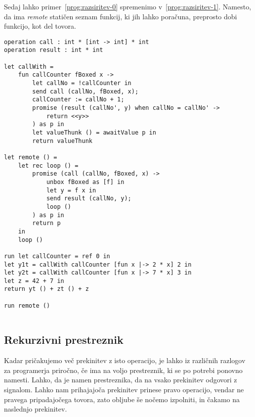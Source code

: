 Sedaj lahko primer~\ref{prog:razsiritev-0} spremenimo v~\ref{prog:razsiritev-1}. Namesto, da ima \emph{remote} statičen seznam funkcij, ki jih lahko poračuna, preprosto dobi funkcijo, kot del tovora.  

\begin{lstlisting}[caption={Računanje zahtevne funkcije v ozadju.},label={prog:razsiritev-1},float,floatplacement=h]
operation call : int * [int -> int] * int
operation result : int * int

let callWith =
	fun callCounter fBoxed x ->
		let callNo = !callCounter in
		send call (callNo, fBoxed, x);
		callCounter := callNo + 1;
		promise (result (callNo', y) when callNo = callNo' ->
			return <<y>>
		) as p in
		let valueThunk () = awaitValue p in
		return valueThunk

let remote () =
	let rec loop () =
		promise (call (callNo, fBoxed, x) ->
			unbox fBoxed as [f] in
			let y = f x in
			send result (callNo, y);
			loop ()
		) as p in
		return p
	in
	loop ()

run	let callCounter = ref 0 in
let y1t = callWith callCounter [fun x |-> 2 * x] 2 in
let y2t = callWith callCounter [fun x |-> 7 * x] 3 in
let z = 42 + 7 in
return yt () + zt () + z

run remote ()
	
\end{lstlisting}

%


\subsection{Rekurzivni prestreznik}




Kadar pričakujemo več prekinitev z isto operacijo, je lahko iz različnih razlogov za programerja priročno, če ima na voljo prestreznik, ki se po potrebi ponovno namesti. Lahko, da je namen prestreznika, da na vsako prekinitev odgovori z signalom. Lahko nam prihajajoča prekinitev prinese pravo operacijo, vendar ne pravega pripadajočega tovora, zato obljube še nočemo izpolniti, in čakamo na naslednjo prekinitev.

